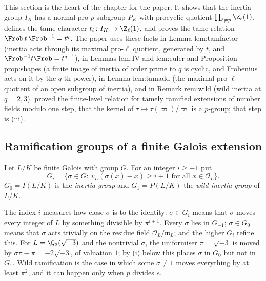 This section is the heart of the chapter for the paper. It shows that the inertia group $I_K$ has a normal pro-$p$ subgroup $P_K$ with
procyclic quotient $\prod_{\ell\ne p}\Z_\ell(1)$, defines the tame character $t_\ell\colon I_K\to\Z_\ell(1)$, and proves the tame relation
$\Frob\,t\,\Frob^{-1}=t^q$. The paper uses these facts in Lemma lem:tamfactor (inertia acts through its maximal pro-$\ell$ quotient, generated by
$t$, and $\Frob^{-1}t\Frob=t^{q^{-1}}$), in Lemmas lem:IV and lem:euler and Proposition prop:shapes (a finite image of inertia of order prime to
$q$ is cyclic, and Frobenius acts on it by the $q$-th power), in Lemma lem:tamadd (the maximal pro-$\ell$ quotient of an open subgroup of
inertia), and in Remark rem:wild (wild inertia at $q=2,3$).  proved the finite-level relation for tamely ramified extensions of
number fields modulo one step, that the kernel of $\tau\mapsto\tau(\varpi)/\varpi$ is a $p$-group; that step is (iii).

\subsection{Ramification groups of a finite Galois extension}

\begin{definition}\label{def:local:ramgroups}
Let $L/K$ be finite Galois with group $G$. For an integer $i\ge-1$ put
\[
G_i=\{\sigma\in G:\ v_L(\sigma(x)-x)\ge i+1\text{ for all }x\in\mathcal O_L\}.
\]
$G_0=I(L/K)$ is the \emph{inertia group} and $G_1=P(L/K)$ the \emph{wild inertia group} of $L/K$.
\end{definition}

The index $i$ measures how close $\sigma$ is to the identity: $\sigma\in G_i$ means that $\sigma$ moves every integer of $L$ by something divisible by
$\pi^{i+1}$. Every $\sigma$ lies in $G_{-1}$; $\sigma\in G_0$ means that $\sigma$ acts trivially on the residue field $\mathcal O_L/\mathfrak m_L$; and the higher
$G_i$ refine this. For $L=\Q_3(\sqrt{-3})$ and the nontrivial $\sigma$, the uniformiser $\pi=\sqrt{-3}$ is moved by $\sigma\pi-\pi=-2\sqrt{-3}$, of
valuation $1$; by (i) below this places $\sigma$ in $G_0$ but not in $G_1$. Wild ramification is the case in which some
$\sigma\ne1$ moves everything by at least $\pi^2$, and it can happen only when $p$ divides $e$.

